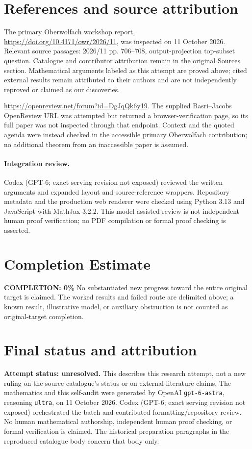 \documentclass[11pt]{article}
\begin{document}
\section{References and source attribution}
The primary Oberwolfach workshop report, \url{https://doi.org/10.4171/owr/2026/11}, was inspected on 11 October 2026. Relevant source passages: 2026/11 pp. 706--708, output-projection top-subset question. Catalogue and contributor attribution remain in the original Sources section. Mathematical arguments labeled as this attempt are proved above; cited external results remain attributed to their authors and are not independently reproved or claimed as our discoveries.

\url{https://openreview.net/forum?id=DgJqQk6y19}. The supplied Basri--Jacobs OpenReview URL was attempted but returned a browser-verification page, so its full paper was not inspected through that endpoint. Context and the quoted agenda were instead checked in the accessible primary Oberwolfach contribution; no additional theorem from an inaccessible paper is assumed.


\paragraph{Integration review.} Codex (GPT-6; exact serving revision not exposed) reviewed the written arguments and expanded layout and source-reference wrappers. Repository metadata and the production web renderer were checked using Python 3.13 and JavaScript with MathJax 3.2.2. This model-assisted review is not independent human proof verification; no PDF compilation or formal proof checking is asserted.

\section{Completion Estimate}
\noindent\textbf{COMPLETION: 0\%}
No substantiated new progress toward the entire original target is claimed. The worked results and failed route are delimited above; a known result, illustrative model, or auxiliary obstruction is not counted as original-target completion.

\section{Final status and attribution}
\textbf{Attempt status: unresolved.} This describes this research attempt, not a new ruling on the source catalogue's status or on external literature claims.
The mathematics and this self-audit were generated by OpenAI \texttt{gpt-6-astra}, reasoning \texttt{ultra}, on 11 October 2026. Codex (GPT-6; exact serving revision not exposed) orchestrated the batch and contributed formatting/repository review. No human mathematical authorship, independent human proof checking, or formal verification is claimed. The historical preparation paragraphs in the reproduced catalogue body concern that body only.
\end{document}
